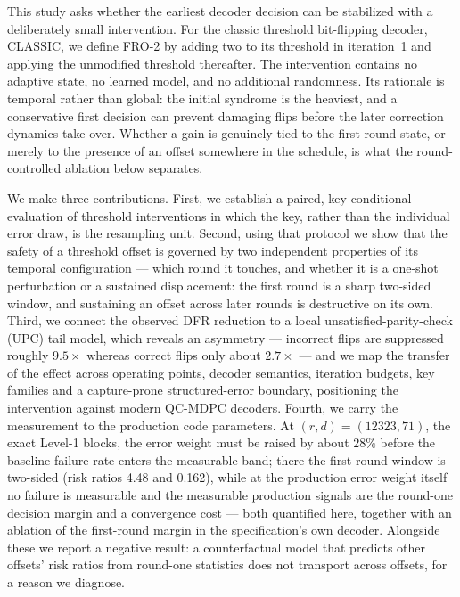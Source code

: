 \documentclass[lettersize,journal]{IEEEtran}
\begin{document}
This study asks whether the earliest decoder decision can be stabilized with a deliberately small intervention. For the classic threshold bit-flipping decoder, CLASSIC, we define FRO-2 by adding two to its threshold in iteration~1 and applying the unmodified threshold thereafter. The intervention contains no adaptive state, no learned model, and no additional randomness. Its rationale is temporal rather than global: the initial syndrome is the heaviest, and a conservative first decision can prevent damaging flips before the later correction dynamics take over. Whether a gain is genuinely tied to the first-round state, or merely to the presence of an offset somewhere in the schedule, is what the round-controlled ablation below separates.

We make three contributions. First, we establish a paired, key-conditional evaluation of threshold interventions in which the key, rather than the individual error draw, is the resampling unit. Second, using that protocol we show that the safety of a threshold offset is governed by two independent properties of its temporal configuration --- which round it touches, and whether it is a one-shot perturbation or a sustained displacement: the first round is a sharp two-sided window, and sustaining an offset across later rounds is destructive on its own. Third, we connect the observed DFR reduction to a local unsatisfied-parity-check (UPC) tail model, which reveals an asymmetry --- incorrect flips are suppressed roughly $9.5\times$ whereas correct flips only about $2.7\times$ --- and we map the transfer of the effect across operating points, decoder semantics, iteration budgets, key families and a capture-prone structured-error boundary, positioning the intervention against modern QC-MDPC decoders. Fourth, we carry the measurement to the production code parameters. At $(r,d)=(12323,71)$, the exact Level-1 blocks, the error weight must be raised by about $28\%$ before the baseline failure rate enters the measurable band; there the first-round window is two-sided (risk ratios 4.48 and 0.162), while at the production error weight itself no failure is measurable and the measurable production signals are the round-one decision margin and a convergence cost --- both quantified here, together with an ablation of the first-round margin in the specification's own decoder. Alongside these we report a negative result: a counterfactual model that predicts other offsets' risk ratios from round-one statistics does not transport across offsets, for a reason we diagnose.
\end{document}
